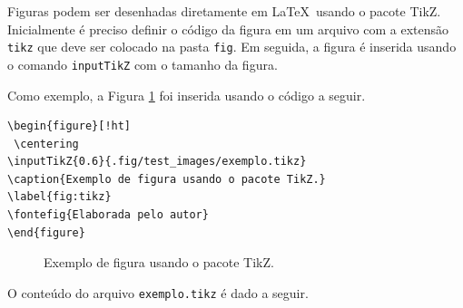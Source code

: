 Figuras podem ser desenhadas diretamente em \LaTeX\ usando o pacote TikZ. Inicialmente é preciso definir o código da figura em um arquivo com a extensão \verb|tikz| que deve ser colocado na pasta \verb|fig|. Em seguida, a figura é inserida usando o comando \verb|inputTikZ| com o tamanho da figura.

Como exemplo, a Figura \ref{fig:tikz} foi inserida usando o código a seguir.

\begin{verbatim}
\begin{figure}[!ht]
 \centering
\inputTikZ{0.6}{.fig/test_images/exemplo.tikz}
\caption{Exemplo de figura usando o pacote TikZ.}
\label{fig:tikz}
\fontefig{Elaborada pelo autor}
\end{figure}
\end{verbatim}

\begin{figure}[!ht]
 \centering
{}
\caption{Exemplo de figura usando o pacote TikZ.}
\label{fig:tikz}
\end{figure}

O conteúdo do arquivo \verb|exemplo.tikz| é dado a seguir.

